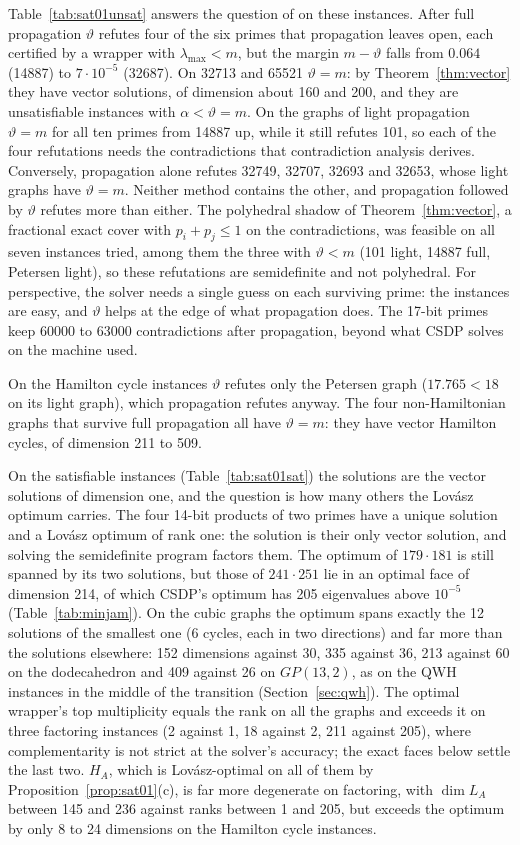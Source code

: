 \documentclass[11pt]{article}
\theoremstyle{definition}
\theoremstyle{remark}
\newcommand{\lmax}{\lambda_{\max}}
\begin{document}
Table~\ref{tab:sat01unsat} answers the question of \cite{Bu07} on these
instances. After full propagation $\vartheta$ refutes four of the six primes
that propagation leaves open, each certified by a wrapper with $\lmax<m$,
but the margin $m-\vartheta$ falls from $0.064$ (14887) to $7\cdot10^{-5}$
(32687). On 32713 and 65521 $\vartheta=m$: by Theorem~\ref{thm:vector} they
have vector solutions, of dimension about 160 and 200, and they are
unsatisfiable instances with $\alpha<\vartheta=m$. On the graphs of light
propagation $\vartheta=m$ for all ten primes from 14887 up, while it still
refutes 101, so each of the four refutations needs the contradictions that
contradiction analysis derives. Conversely, propagation alone refutes 32749,
32707, 32693 and 32653, whose light graphs have $\vartheta=m$. Neither method
contains the other, and propagation followed by $\vartheta$ refutes more than
either. The polyhedral shadow of Theorem~\ref{thm:vector}, a fractional
exact cover with $p_i+p_j\leq1$ on the contradictions, was feasible on all
seven instances tried, among them the three with $\vartheta<m$ (101 light,
14887 full, Petersen light), so these refutations are semidefinite and not
polyhedral. For perspective, the solver needs a single guess on each
surviving prime: the instances are easy, and $\vartheta$ helps at the edge of
what propagation does. The 17-bit primes keep 60000 to 63000 contradictions
after propagation, beyond what CSDP solves on the machine used.

On the Hamilton cycle instances $\vartheta$ refutes only the Petersen graph
($17.765<18$ on its light graph), which propagation refutes anyway. The four
non-Hamiltonian graphs that survive full propagation all have
$\vartheta=m$: they have vector Hamilton cycles, of dimension 211 to 509.

On the satisfiable instances (Table~\ref{tab:sat01sat}) the solutions are
the vector solutions of dimension one, and the question is how many others
the Lov\'asz optimum carries. The four 14-bit products of two primes have a
unique solution and a Lov\'asz optimum of rank one: the solution is their
only vector solution, and solving the semidefinite program factors them.
The optimum of $179\cdot181$ is still spanned by its two solutions, but those
of $241\cdot251$ lie in an optimal face of dimension 214, of which CSDP's
optimum has 205 eigenvalues above $10^{-5}$ (Table~\ref{tab:minjam}). On the cubic graphs the
optimum spans exactly the 12 solutions of the smallest one (6 cycles, each in
two directions) and far more than the solutions elsewhere: 152 dimensions
against 30, 335 against 36, 213 against 60 on the dodecahedron and 409
against 26 on $GP(13,2)$, as on the QWH instances in the middle of the
transition (Section~\ref{sec:qwh}). The optimal wrapper's top multiplicity
equals the rank on all the graphs and exceeds it on three factoring
instances (2 against 1, 18 against 2, 211 against 205), where
complementarity is not strict at the solver's accuracy; the exact faces
below settle the last two. $H_A$, which is
Lov\'asz-optimal on all of them by Proposition~\ref{prop:sat01}(c), is far
more degenerate on factoring, with $\dim L_A$ between 145 and 236 against
ranks between 1 and 205, but exceeds the optimum by only 8 to 24 dimensions
on the Hamilton cycle instances.
\end{document}
